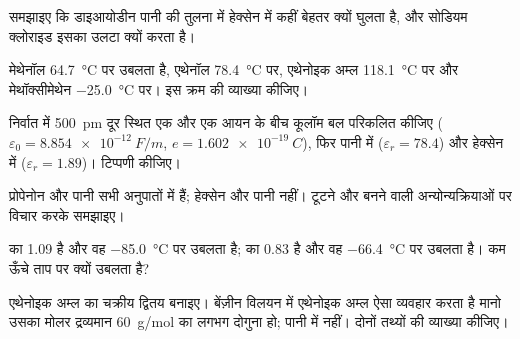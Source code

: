 \begin{exercise}[$\star$]\label{exo:b1:intermolecular-forces-solvents:4}
समझाइए कि डाइआयोडीन पानी की तुलना में हेक्सेन में कहीं बेहतर क्यों घुलता है, और
सोडियम क्लोराइड इसका उलटा क्यों करता है।
\end{exercise}

\begin{exercise}[$\star\star$]\label{exo:b1:intermolecular-forces-solvents:5}
मेथेनॉल \qty{64.7}{\celsius} पर उबलता है, एथेनॉल \qty{78.4}{\celsius} पर,
एथेनोइक अम्ल \qty{118.1}{\celsius} पर और मेथॉक्सीमेथेन
\qty{-25.0}{\celsius} पर। इस क्रम की व्याख्या कीजिए।
\end{exercise}

\begin{exercise}[$\star\star$]\label{exo:b1:intermolecular-forces-solvents:6}
निर्वात में \qty{500}{pm} दूर स्थित एक  और एक  आयन के बीच कूलॉम बल
परिकलित कीजिए ($\varepsilon_0 = \qty{8.854e-12}{F/m}$,
$e = \qty{1.602e-19}{C}$), फिर पानी में ($\varepsilon_r = 78.4$) और
हेक्सेन में ($\varepsilon_r = 1.89$)। टिप्पणी कीजिए।
\end{exercise}

\begin{exercise}[$\star\star$]\label{exo:b1:intermolecular-forces-solvents:7}
प्रोपेनोन और पानी सभी अनुपातों में  हैं; हेक्सेन और पानी
नहीं। टूटने और बनने वाली अन्योन्यक्रियाओं पर विचार करके समझाइए।
\end{exercise}

\begin{exercise}[$\star\star$]\label{exo:b1:intermolecular-forces-solvents:8}
 का  \qty{1.09}{\debye} है और वह
\qty{-85.0}{\celsius} पर उबलता है;  का \qty{0.83}{\debye} है और वह
\qty{-66.4}{\celsius} पर उबलता है। कम  ऊँचे ताप पर क्यों उबलता है?
\end{exercise}

\begin{exercise}[$\star\star$]\label{exo:b1:intermolecular-forces-solvents:9}
एथेनोइक अम्ल का चक्रीय द्वितय बनाइए। बेंज़ीन विलयन में एथेनोइक
अम्ल ऐसा व्यवहार करता है मानो उसका मोलर द्रव्यमान \qty{60}{g/mol} का लगभग दोगुना हो; पानी
में नहीं। दोनों तथ्यों की व्याख्या कीजिए।
\end{exercise}

